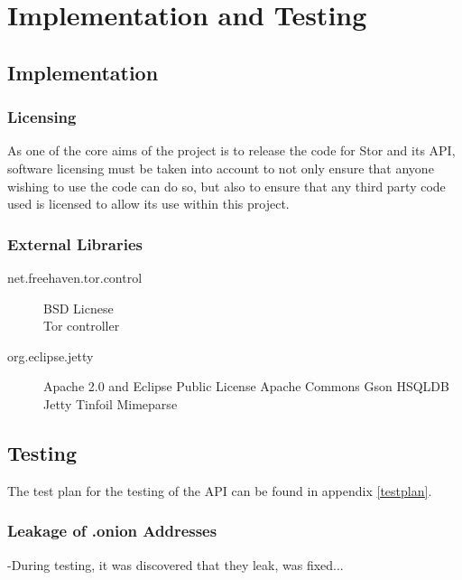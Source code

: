 \section{Implementation and Testing}
	\subsection{Implementation}
		\subsubsection*{Licensing}
			As one of the core aims of the project is to release the code for Stor and its API, software licensing must be taken into account to not only ensure that anyone wishing to use the code can do so, but also to ensure that any third party code used is licensed to allow its use within this project.
			
		\subsubsection*{External Libraries}
			\begin{description}
				\item[net.freehaven.tor.control] BSD Licnese \\
				Tor controller
				\item[org.eclipse.jetty] Apache 2.0 and Eclipse Public License
				Apache Commons
				Gson
				HSQLDB
				Jetty
				Tinfoil
				Mimeparse
				
			\end{description}
	\subsection{Testing}
		The test plan for the testing of the API can be found in appendix \ref{testplan}.
		\subsubsection*{Leakage of .onion Addresses}
			-During testing, it was discovered that they leak, was fixed...